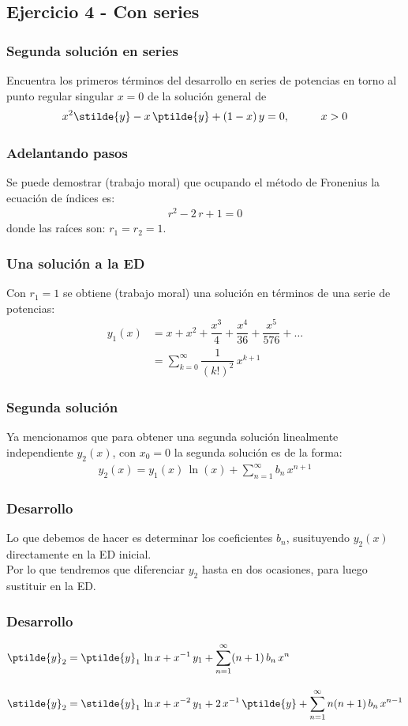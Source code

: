 \subsection{Ejercicio 4 - Con series}
\begin{frame}
\frametitle{Segunda solución en series}
Encuentra los primeros términos del desarrollo en series de potencias en torno al punto regular singular $x = 0$ de la solución general de
\begin{align*}
x^{2} \stilde{y}  - x \, \ptilde{y} + (1 - x) \, y = 0, \hspace{1cm} x > 0
\end{align*} 
\end{frame}
\begin{frame}
\frametitle{Adelantando pasos}
Se puede demostrar (trabajo moral) que ocupando el método de Fronenius la ecuación de índices es:
\begin{align*}
r^{2} - 2 \, r + 1 = 0
\end{align*}
donde las raíces son: $r_{1} = r_{2} = 1$.
\end{frame}
\begin{frame}
\frametitle{Una solución a la ED}
Con $r_{1} = 1$ se obtiene (trabajo moral) una solución en términos de una serie de potencias:
\begin{align*}
y_{1}(x) &= x + x^{2} + \dfrac{x^{3}}{4} + \dfrac{x^{4}}{36} + \dfrac{x^{5}}{576} + \ldots \\[1em]
&= \sum_{k=0}^{\infty} \dfrac{1}{(k!)^{2}} \, x^{k+1}
\end{align*}
\end{frame}
\begin{frame}
\frametitle{Segunda solución}
Ya mencionamos que para obtener una segunda solución linealmente independiente $y_{2}(x)$, con $x_{0}=0$ la segunda solución es de la forma:
\begin{align*}
y_{2} (x) = y_{1}(x) \, \ln (x) + \sum_{n=1}^{\infty} b_{n} \, x^{n+1}
\end{align*}
\end{frame}
\begin{frame}
\frametitle{Desarrollo}
Lo que debemos de hacer es determinar los coeficientes $b_{n}$, susituyendo $y_{2}(x)$ directamente en la ED inicial.
\\
\bigskip
\pause
Por lo que tendremos que diferenciar $y_{2}$ hasta en dos ocasiones, para luego sustituir en la ED.
\end{frame}
\begin{frame}
\frametitle{Desarrollo}
\begin{align*}
\ptilde{y}_{2} &= \ptilde{y}_{1} \, \ln x + x^{-1} \, y_{1} + \sum_{n=1}^{\infty} (n + 1) \, b_{n} \, x^{n} \\[1em]
\stilde{y}_{2} &= \stilde{y}_{1} \, \ln x + x^{-2} \, y_{1} + 2 \, x^{-1} \, \ptilde{y} + \sum_{n=1}^{\infty} n (n + 1) \, b_{n} \, x^{n-1}
\end{align*}
\end{frame}
